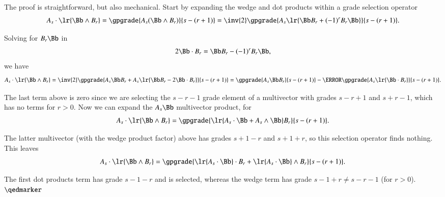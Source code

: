 %
%
The proof is straightforward, but also mechanical.
Start by expanding the wedge and dot products within a grade selection operator
\begin{dmath}\label{eqn:wedgeDistributionIdentityProblemsWedgeDistributionIdentityProof:1460}
A_s \cdot \lr{ \Bb \wedge B_r }
=
\gpgrade{A_s (\Bb \wedge B_r)}{s - (r + 1)}
=
\inv{2} \gpgrade{A_s \lr{\Bb B_r + (-1)^{r} B_r \Bb} }{s - (r + 1)}.
\end{dmath}

Solving for \(B_r \Bb\) in
\begin{dmath}\label{eqn:wedgeDistributionIdentityProblemsWedgeDistributionIdentityProof:1480}
2 \Bb \cdot B_r = \Bb B_r - (-1)^{r} B_r \Bb,
\end{dmath}
we have
\begin{dmath}\label{eqn:wedgeDistributionIdentityProblemsWedgeDistributionIdentityProof:1500}
A_s \cdot \lr{ \Bb \wedge B_r }
=
\inv{2} \gpgrade{ A_s \Bb B_r + A_s \lr{ \Bb B_r - 2 \Bb \cdot B_r } }{s - (r + 1)}
=
\gpgrade{ A_s \Bb B_r }{s - (r + 1)}
-
\cancel{\gpgrade{ A_s \lr{ \Bb \cdot B_r } }{s - (r + 1)}}.
\end{dmath}

The last term above is zero since we are selecting the \(s - r - 1\) grade element of a multivector with grades \(s - r + 1\) and \(s + r - 1\), which has no terms for \(r > 0\).
Now we can expand the \(A_s \Bb\) multivector product, for
\begin{dmath}\label{eqn:wedgeDistributionIdentityProblemsWedgeDistributionIdentityProof:1520}
A_s \cdot \lr{ \Bb \wedge B_r }
=
\gpgrade{ \lr{ A_s \cdot \Bb + A_s \wedge \Bb} B_r }{s - (r + 1)}.
\end{dmath}

The latter multivector (with the wedge product factor) above has grades \(s + 1 - r\) and \(s + 1 + r\), so this selection operator finds nothing.
This leaves
\begin{dmath}\label{eqn:wedgeDistributionIdentityProblemsWedgeDistributionIdentityProof:1540}
A_s \cdot \lr{ \Bb \wedge B_r }
=
\gpgrade{
\lr{ A_s \cdot \Bb } \cdot B_r
+ \lr{ A_s \cdot \Bb } \wedge B_r
}{s - (r + 1)}.
\end{dmath}

The first dot products term has grade \(s - 1 - r\) and is selected, whereas the wedge term has grade \(s - 1 + r \ne s - r - 1\) (for \(r > 0\)).  \(\qedmarker\)

